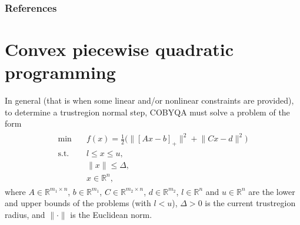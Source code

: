 \documentclass[letterpaper,10pt,english]{sphinxmanual}
\newcommand{\norm}[2][]{#1\lVert#2#1\rVert}
\def\R{\ensuremath{\mathds{R}}}
\begin{document}
\subsubsection*{References}


\section{Convex piecewise quadratic programming}
\label{\detokenize{algo/linalg.cpqp:convex-piecewise-quadratic-programming}}\label{\detokenize{algo/linalg.cpqp:linalg-cpqp}}\label{\detokenize{algo/linalg.cpqp::doc}}
\sphinxAtStartPar
In general (that is when some linear and/or nonlinear constraints are
provided), to determine a trust\sphinxhyphen{}region normal step, COBYQA must solve a problem
of the form
\begin{equation}\label{equation:algo/linalg.cpqp:cpqp}
\begin{split}\begin{array}{ll}
    \min        & \quad f(x) = \frac{1}{2} \big(\norm{[Ax - b]_+}^2 + \norm{Cx - d}^2\big)\\
    \text{s.t.} & \quad l \le x \le u,\\
                & \quad \norm{x} \le \Delta,\\
                & \quad x \in \R^n,
\end{array}\end{split}
\end{equation}
\sphinxAtStartPar
where \(A \in \R^{m_1 \times n}\), \(b \in \R^{m_1}\),
\(C \in \R^{m_2 \times n}\), \(d \in \R^{m_2}\), \(l \in \R^n\) and
\(u \in \R^n\) are the lower and upper bounds of the problems
(with \(l < u\)), \(\Delta > 0\) is the current trust\sphinxhyphen{}region radius,
and \(\norm{\cdot}\) is the Euclidean norm.
\end{document}
